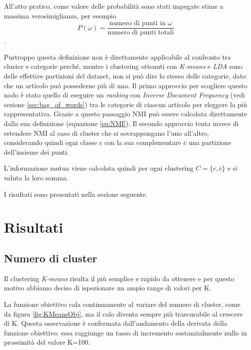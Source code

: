\documentclass[
	11pt, %
	a4paper, %
	oneside, %
	headinclude,footinclude, %
	BCOR5mm, %
]{scrartcl}
\begin{document}
			All'atto pratico, come valore delle probabilità sono stati impegate stime a massima verosimiglianza, per esempio
			\begin{equation*}
				P(\omega) = \frac
					{ \text{numero di punti in }\omega }
					{ \text{numero di punti totali} }
			\end{equation*}.

			\smallbreak

			Purtroppo questa definizione non è direttamente applicabile al confronto tra cluster e categorie perché, mentre i clustering ottenuti con \emph{K-means} e \emph{LDA} sono delle effettive partizioni del dataset, non si può dire lo stesso delle categorie, dato che un articolo può possederne più di una.
			\smallbreak
			Il primo approccio per scogliere questo nodo è stato quello di eseguire un \emph{ranking} con \emph{Inverse Document Frequency} (vedi sezione \ref{sec:bag_of_words}) tra le categorie di ciascun articolo per eleggere la più rappresentativa.
			Grazie a questo passaggio NMI può essere calcolata direttamente dalla sua definizione (equazione \ref{eq:NMI}).
			\smallbreak
			Il secondo approccio tenta invece di estendere NMI al caso di cluster che si sovrappongano l'uno all'altro, considerando quindi ogni classe $c$ con la sua complementare $\bar{c}$ una partizione dell'insieme dei punti.

			L'informazione mutua viene calcolata quindi per ogni clustering $C = \{c, \bar{c}\}$ e si valuta la loro somma.

			\smallbreak
			I risultati sono presentati nella sezione seguente.

\section{Risultati}

	\subsection{Numero di cluster}
		Il clustering \emph{K-means} risulta il più semplice e rapido da ottenere e per questo motivo abbiamo deciso di ispezionare un ampio range di valori per K.

		La funzione obiettivo cala continuamente al variare del numero di cluster, come da figura \ref{fig:KMeansObj}, ma il calo diventa sempre più trascurabile al crescere di K.
		Questa osservazione è confermata dall'andamento della derivata della funzione obiettivo: essa raggiunge un tasso di incremento sostanzialmente nullo in prossimità del valore K=100.
\end{document}
